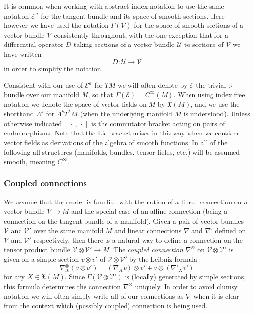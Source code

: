 \documentclass[a4paper,12pt]{amsart}
\def\Cal{\mathcal}
\newcommand{\ce}{{\Cal E}}
\def\cV{\mathcal{V}}
\theoremstyle{remark}
\begin{document}
It is common when working with abstract index notation to use the same notation $\ce^a$ for the tangent bundle and its space of smooth sections. Here however we have used the notation $\Gamma(\cV)$ for the space of smooth sections of a vector bundle $\cV$ consistently throughout, with the one exception that for a differential operator $D$ taking sections of a vector bundle $\mathcal{U}$ to sections of $\cV$ we have written
$$
D:\mathcal{U}\rightarrow \cV
$$
in order to simplify the notation.

Consistent with our use of $\ce^a$ for $TM$ we will often denote by $\ce$ the trivial $\mathbb{R}$-bundle over our manifold $M$, so that $\Gamma(\ce)=C^\infty (M)$. When using index free notation we denote the space of vector fields on $M$ by $\mathfrak{X} (M)$, and we use the shorthand $\Lambda^k$ for $\Lambda^k T^*M$ (when the underlying manifold $M$ is understood). Unless otherwise indicated $[\,\cdot\, , \,\cdot\,]$ is the commutator bracket acting on pairs of endomorphisms. Note that the Lie bracket arises in this way when we consider vector fields as derivations of the algebra of smooth functions. In all of the following all structures (manifolds, bundles, tensor fields, etc.) will be assumed smooth, meaning $C^\infty$.
 
\subsubsection{Coupled connections} We assume that the reader is familiar with the notion of a linear connection on a vector bundle $\cV \rightarrow M$ and the special case of an affine connection (being a connection on the tangent bundle of a manifold). Given a pair of vector bundles $\cV$ and $\cV'$ over the same manifold $M$ and linear connections $\nabla$ and $\nabla'$ defined on $\cV$ and $\cV'$ respectively, then there is a natural way to define a connection on the tensor product bundle $\cV\otimes \cV'\rightarrow M$. The \emph{coupled connection} $\nabla^\otimes$ on $\cV\otimes \cV'$ is given on a simple section $v\otimes v'$ of $\cV\otimes \cV'$ by the Leibniz formula
$$
\nabla^{\otimes}_X (v\otimes v') = (\nabla_X v)\otimes v' + v\otimes (\nabla'_X v')
$$
for any $X\in \mathfrak{X}(M)$. Since $\Gamma(\cV\otimes \cV')$ is (locally) generated by simple sections, this formula determines the connection $\nabla^{\otimes}$ uniquely. In order to avoid clumsy notation we will often simply write all of our connections as $\nabla$ when it is clear from the context which (possibly coupled) connection is being used.
\end{document}

